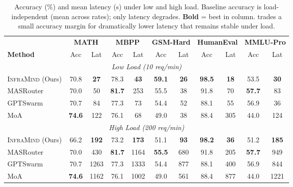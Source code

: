 \begin{table}[t]
\centering
\caption{Accuracy (\%) and mean latency (s) under low and high load. Baseline accuracy is load-independent (mean across rates); only latency degrades. \textbf{Bold} = best in column. \sys{} trades a small accuracy margin for dramatically lower latency that remains stable under load.}
\label{tab:main_results}
\small
\begin{tabular}{l cc cc cc cc cc}
\toprule
& \multicolumn{2}{c}{\textbf{MATH}} & \multicolumn{2}{c}{\textbf{MBPP}} & \multicolumn{2}{c}{\textbf{GSM-Hard}} & \multicolumn{2}{c}{\textbf{HumanEval}} & \multicolumn{2}{c}{\textbf{MMLU-Pro}} \\
\cmidrule(lr){2-3} \cmidrule(lr){4-5} \cmidrule(lr){6-7} \cmidrule(lr){8-9} \cmidrule(lr){10-11}
\textbf{Method} & Acc & Lat & Acc & Lat & Acc & Lat & Acc & Lat & Acc & Lat \\
\midrule
\multicolumn{11}{c}{\cellcolor{green!5}\textit{Low Load (10 req/min)}} \\
\midrule
\textsc{InfraMind} (Ours) & 70.8 & \textbf{27} & 78.3 & \textbf{43} & \textbf{59.1} & \textbf{26} & \textbf{98.5} & \textbf{18} & 53.5 & \textbf{30} \\
MASRouter & 70.0 & 50 & \textbf{81.7} & 253 & 55.5 & 38 & 91.8 & 70 & \textbf{57.7} & 83 \\
GPTSwarm & 70.7 & 84 & 77.3 & 73 & 54.4 & 52 & 88.1 & 55 & 56.9 & 36 \\
MoA & \textbf{74.6} & 122 & 76.1 & 68 & 49.0 & 38 & 88.4 & 305 & 44.0 & 124 \\
\midrule
\multicolumn{11}{c}{\cellcolor{red!5}\textit{High Load (200 req/min)}} \\
\midrule
\textsc{InfraMind} (Ours) & 66.2 & \textbf{192} & 73.2 & \textbf{173} & 51.1 & \textbf{93} & \textbf{98.2} & \textbf{36} & 51.2 & \textbf{185} \\
MASRouter & 70.0 & 430 & \textbf{81.7} & 1164 & \textbf{55.5} & 680 & 91.8 & 205 & \textbf{57.7} & 949 \\
GPTSwarm & 70.7 & 1263 & 77.3 & 1333 & 54.4 & 877 & 88.1 & 400 & 56.9 & 844 \\
MoA & \textbf{74.6} & 1162 & 76.1 & 1002 & 49.0 & 561 & 88.4 & 877 & 44.0 & 1221 \\
\bottomrule
\end{tabular}
\end{table}


